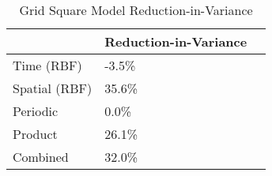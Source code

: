 \begin{table}[]
\centering
\caption{Grid Square Model Reduction-in-Variance}
\label{variance_grid}
\begin{tabular}{@{}lll@{}}
\toprule
              & Reduction-in-Variance &  \\ \midrule
Time (RBF)    & -3.5\%                &  \\
Spatial (RBF) & 35.6\%                &  \\
Periodic      & 0.0\%                 &  \\
Product       & 26.1\%                &  \\
Combined      & 32.0\%                &  \\ \bottomrule
\end{tabular}
\end{table}
